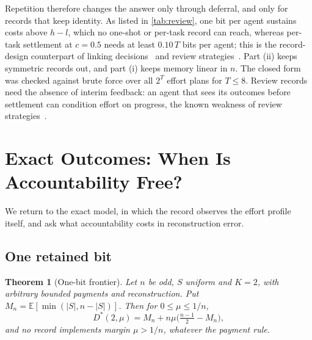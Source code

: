 \documentclass[sigconf,anonymous,acmthm=false]{aamas}
\theoremstyle{acmplain}
\newtheorem{theorem}{Theorem}
\theoremstyle{acmdefinition}
\newcommand{\E}{\mathbb{E}}
\begin{document}
Repetition therefore changes the answer only through deferral, and only for records that keep
identity. As listed in \cref{tab:review}, one bit per agent sustains costs above $h-l$, which no
one-shot or per-task record can reach, whereas per-task settlement at $c=0.5$ needs at least
$0.10\,T$ bits per agent; this is the record-design counterpart of linking
decisions~\cite{jacksonsonnenschein2007} and review strategies~\cite{radner1985repeated}.
Part (ii) keeps symmetric records out, and part (i) keeps memory linear in $n$. The closed form
was checked against brute force over all $2^T$ effort plans for $T\le8$. Review records need
the absence of interim feedback: an agent that sees its outcomes before settlement can condition
effort on progress, the known weakness of review strategies~\cite{radner1985repeated}.

\section{Exact Outcomes: When Is Accountability Free?}\label{sec:exact}


We return to the exact model, in which the record observes the effort profile itself, and
ask what accountability costs in reconstruction error.

\subsection{One retained bit}\label{sec:onebit}

\begin{theorem}[One-bit frontier]\label{thm:onebit}
Let $n$ be odd, $S$ uniform and $K=2$, with arbitrary bounded payments and reconstruction.
Put $M_n=\E[\min(|S|,n-|S|)]$. Then for $0\le\mu\le1/n$,
\[ D^*(2,\mu)=M_n+n\mu\Big(\tfrac{n-1}{2}-M_n\Big), \]
and no record implements margin $\mu>1/n$, whatever the payment rule.
\end{theorem}
\end{document}
